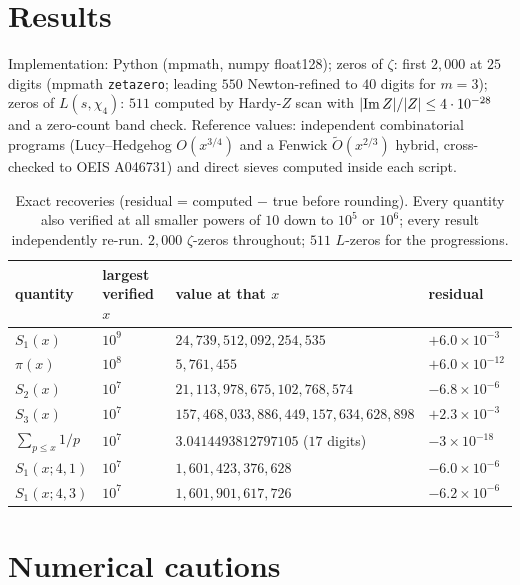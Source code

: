 \documentclass[11pt]{article}
\begin{document}
\section{Results}\label{sec:results}

Implementation: Python (mpmath, numpy float128); zeros of $\zeta$: first
$2{,}000$ at $25$ digits (mpmath \texttt{zetazero}; leading $550$
Newton-refined to $40$ digits for $m=3$); zeros of $L(s,\chi_4)$: $511$
computed by Hardy-$Z$ scan with $|{\rm Im}\,Z|/|Z|\le4\cdot10^{-28}$ and a
zero-count band check. Reference values: independent combinatorial
programs (Lucy--Hedgehog $O(x^{3/4})$ and a Fenwick $\tilde O(x^{2/3})$
hybrid, cross-checked to OEIS A046731) and direct sieves computed inside
each script.

\begin{table}[h]\centering
\small
\begin{tabular}{llll}
\toprule
quantity & largest verified $x$ & value at that $x$ & residual \\
\midrule
$S_1(x)$ & $10^9$ & $24{,}739{,}512{,}092{,}254{,}535$ & $+6.0\times10^{-3}$ \\
$\pi(x)$ & $10^8$ & $5{,}761{,}455$ & $+6.0\times10^{-12}$ \\
$S_2(x)$ & $10^7$ & $21{,}113{,}978{,}675{,}102{,}768{,}574$ & $-6.8\times10^{-6}$ \\
$S_3(x)$ & $10^7$ & $157{,}468{,}033{,}886{,}449{,}157{,}634{,}628{,}898$ & $+2.3\times10^{-3}$ \\
$\sum_{p\le x}1/p$ & $10^7$ & $3.0414493812797105$ ($17$ digits) & $-3\times10^{-18}$ \\
$S_1(x;4,1)$ & $10^7$ & $1{,}601{,}423{,}376{,}628$ & $-6.0\times10^{-6}$ \\
$S_1(x;4,3)$ & $10^7$ & $1{,}601{,}901{,}617{,}726$ & $-6.2\times10^{-6}$ \\
\bottomrule
\end{tabular}
\caption{Exact recoveries (residual = computed $-$ true before rounding).
Every quantity also verified at all smaller powers of $10$ down to $10^5$
or $10^6$; every result independently re-run. $2{,}000$ $\zeta$-zeros
throughout; $511$ $L$-zeros for the progressions.}
\label{tab:results}
\end{table}

\section{Numerical cautions}\label{sec:cautions}
\end{document}
